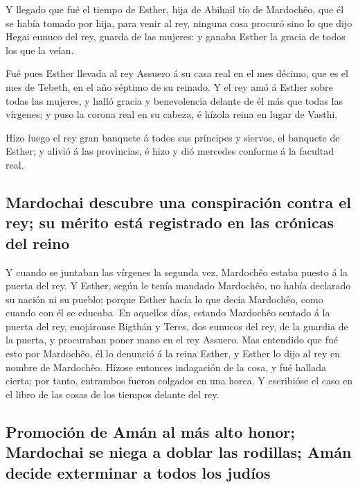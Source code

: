  Y llegado que fué el tiempo de Esther, hija de Abihail
tío de Mardochêo, que él se había tomado por hija, para venir al rey,
ninguna cosa procuró sino lo que dijo Hegai eunuco del rey, guarda de
las mujeres: y ganaba Esther la gracia de todos los que la veían.

 Fué pues Esther llevada al rey Assuero á su casa real en
el mes décimo, que es el mes de Tebeth, en el año séptimo de su reinado.
 Y el rey amó á Esther sobre todas las mujeres, y halló
gracia y benevolencia delante de él más que todas las vírgenes; y puso
la corona real en su cabeza, é hízola reina en lugar de Vasthi.

 Hizo luego el rey gran banquete á todos sus príncipes y
siervos, el banquete de Esther; y alivió á las provincias, é hizo y dió
mercedes conforme á la facultad real.

\hypertarget{mardochai-descubre-una-conspiraciuxf3n-contra-el-rey-su-muxe9rito-estuxe1-registrado-en-las-cruxf3nicas-del-reino}{%
\subsection{Mardochai descubre una conspiración contra el rey; su mérito
está registrado en las crónicas del
reino}\label{mardochai-descubre-una-conspiraciuxf3n-contra-el-rey-su-muxe9rito-estuxe1-registrado-en-las-cruxf3nicas-del-reino}}

 Y cuando se juntaban las vírgenes la segunda vez,
Mardochêo estaba puesto á la puerta del rey.  Y Esther,
según le tenía mandado Mardochêo, no había declarado su nación ni su
pueblo; porque Esther hacía lo que decía Mardochêo, como cuando con él
se educaba.  En aquellos días, estando Mardochêo sentado
á la puerta del rey, enojáronse Bigthán y Teres, dos eunucos del rey, de
la guardia de la puerta, y procuraban poner mano en el rey Assuero.
 Mas entendido que fué esto por Mardochêo, él lo denunció
á la reina Esther, y Esther lo dijo al rey en nombre de Mardochêo.
 Hízose entonces indagación de la cosa, y fué hallada
cierta; por tanto, entrambos fueron colgados en una horca. Y escribióse
el caso en el libro de las cosas de los tiempos delante del rey.

\hypertarget{promociuxf3n-de-amuxe1n-al-muxe1s-alto-honor-mardochai-se-niega-a-doblar-las-rodillas-amuxe1n-decide-exterminar-a-todos-los-juduxedos}{%
\subsection{Promoción de Amán al más alto honor; Mardochai se niega a
doblar las rodillas; Amán decide exterminar a todos los
judíos}\label{promociuxf3n-de-amuxe1n-al-muxe1s-alto-honor-mardochai-se-niega-a-doblar-las-rodillas-amuxe1n-decide-exterminar-a-todos-los-juduxedos}}

